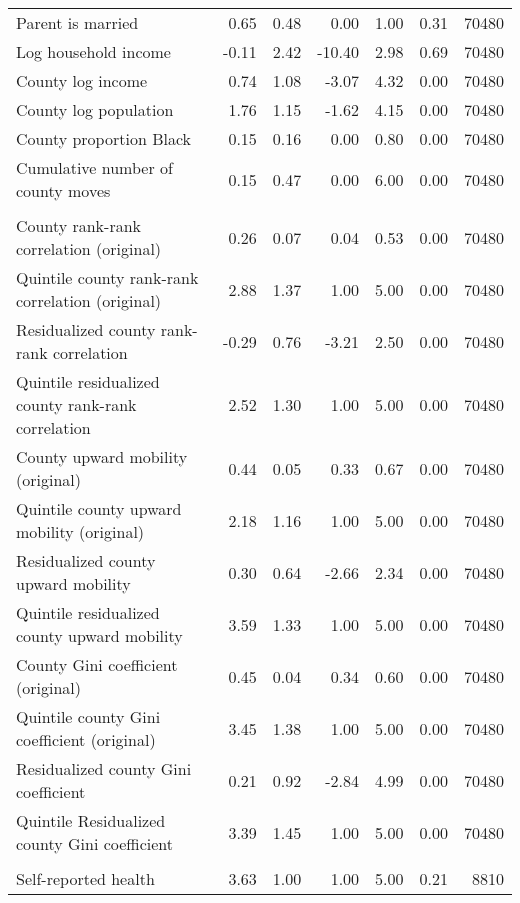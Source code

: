 \begin{table}[htp]
\begin{threeparttable}
\begin{tabular}{lrrrrrr}
  Parent is married & 0.65 & 0.48 & 0.00 & 1.00 & 0.31 & 70480 \\ 
  Log household income & -0.11 & 2.42 & -10.40 & 2.98 & 0.69 & 70480 \\ 
  County log income & 0.74 & 1.08 & -3.07 & 4.32 & 0.00 & 70480 \\ 
  County log population & 1.76 & 1.15 & -1.62 & 4.15 & 0.00 & 70480 \\ 
  County proportion Black & 0.15 & 0.16 & 0.00 & 0.80 & 0.00 & 70480 \\ 
  Cumulative number of county moves & 0.15 & 0.47 & 0.00 & 6.00 & 0.00 & 70480 \\ 
   \addlinespace
\multicolumn{7}{l}{\textbf{\textit{Exposure variables}}} \\
\addlinespace
County rank-rank correlation (original) & 0.26 & 0.07 & 0.04 & 0.53 & 0.00 & 70480 \\ 
  Quintile county rank-rank correlation (original) & 2.88 & 1.37 & 1.00 & 5.00 & 0.00 & 70480 \\ 
  Residualized county rank-rank correlation & -0.29 & 0.76 & -3.21 & 2.50 & 0.00 & 70480 \\ 
  Quintile residualized county rank-rank correlation & 2.52 & 1.30 & 1.00 & 5.00 & 0.00 & 70480 \\ 
  County upward mobility (original) & 0.44 & 0.05 & 0.33 & 0.67 & 0.00 & 70480 \\ 
  Quintile county upward mobility (original) & 2.18 & 1.16 & 1.00 & 5.00 & 0.00 & 70480 \\ 
  Residualized county upward mobility & 0.30 & 0.64 & -2.66 & 2.34 & 0.00 & 70480 \\ 
  Quintile residualized county upward mobility & 3.59 & 1.33 & 1.00 & 5.00 & 0.00 & 70480 \\ 
  County Gini coefficient (original) & 0.45 & 0.04 & 0.34 & 0.60 & 0.00 & 70480 \\ 
  Quintile county Gini coefficient (original) & 3.45 & 1.38 & 1.00 & 5.00 & 0.00 & 70480 \\ 
  Residualized county Gini coefficient & 0.21 & 0.92 & -2.84 & 4.99 & 0.00 & 70480 \\ 
  Quintile Residualized county Gini coefficient & 3.39 & 1.45 & 1.00 & 5.00 & 0.00 & 70480 \\ 
   \addlinespace
\multicolumn{7}{l}{\textbf{\textit{Outcomes}}} \\
\addlinespace
Self-reported health & 3.63 & 1.00 & 1.00 & 5.00 & 0.21 & 8810 \\ 

\end{tabular}
\end{threeparttable}
\end{table}
